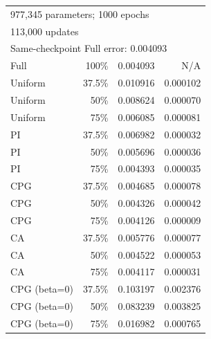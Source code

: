\begin{table}[t]
\begin{tabular}{lrrr}
\multicolumn{4}{l}{977,345 parameters; 1000 epochs} \\
\multicolumn{4}{l}{113,000 updates} \\
\multicolumn{4}{l}{Same-checkpoint Full error: 0.004093} \\
Full & 100\% & 0.004093 & N/A \\
Uniform & 37.5\% & 0.010916 & 0.000102 \\
Uniform & 50\% & 0.008624 & 0.000070 \\
Uniform & 75\% & 0.006085 & 0.000081 \\
PI & 37.5\% & 0.006982 & 0.000032 \\
PI & 50\% & 0.005696 & 0.000036 \\
PI & 75\% & 0.004393 & 0.000035 \\
CPG & 37.5\% & 0.004685 & 0.000078 \\
CPG & 50\% & 0.004326 & 0.000042 \\
CPG & 75\% & 0.004126 & 0.000009 \\
CA & 37.5\% & 0.005776 & 0.000077 \\
CA & 50\% & 0.004522 & 0.000053 \\
CA & 75\% & 0.004117 & 0.000031 \\
CPG (beta=0) & 37.5\% & 0.103197 & 0.002376 \\
CPG (beta=0) & 50\% & 0.083239 & 0.003825 \\
CPG (beta=0) & 75\% & 0.016982 & 0.000765 \\
\bottomrule
\end{tabular}
\end{table}
